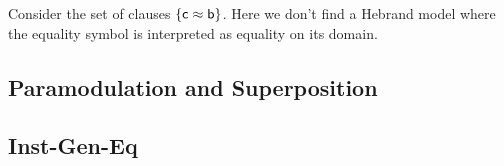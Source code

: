 \begin{example}
	Consider the set of clauses $\{ {\mathsf c} \approx {\mathsf b} \}$. 
	Here we don't find a Hebrand model where the equality symbol is interpreted as equality on its domain.
\end{example}


	
	

\subsection{Paramodulation and Superposition}



\subsection{Inst-Gen-Eq}

